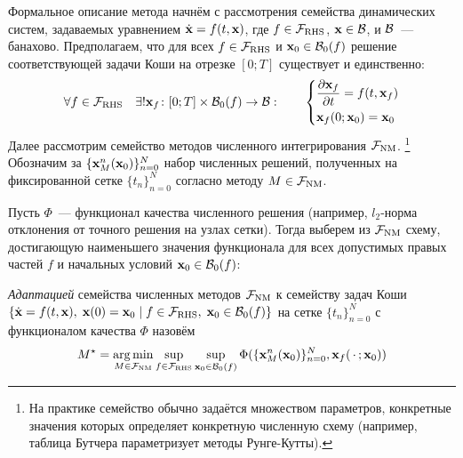 Формальное описание метода начнём с рассмотрения семейства динамических систем,
задаваемых уравнением $ \dot{\mathbf{x}} = f(t, \mathbf{x}) $,
где $ f \in \mathcal{F}_{\textnormal{RHS}} $, $ \mathbf{x} \in \mathcal{B} $, и $ \mathcal{B} $~--- банахово.
Предполагаем, что для всех $ f \in \mathcal{F}_{\textnormal{RHS}} $ и $ \mathbf{x}_0 \in \mathcal{B}_0(f) $ решение соответствующей задачи Коши
на отрезке $ [0; T] $ существует и единственно:
\[
    \forall f \in \mathcal{F}_{\textnormal{RHS}} \quad \exists! \mathbf{x}_f \colon [0; T] \times \mathcal{B}_0(f) \to \mathcal{B}: \qquad
    \begin{dcases}
        \frac{\partial \mathbf{x}_f}{\partial t} = f(t, \mathbf{x}_f) \\
        \mathbf{x}_f(0; \mathbf{x}_0) = \mathbf{x}_0
    \end{dcases}
\]
Далее рассмотрим семейство методов численного интегрирования $ \mathcal{F}_{\textnormal{NM}} $.%
\footnote{На практике семейство обычно задаётся множеством параметров,
конкретные значения которых определяет конкретную численную схему
(например, таблица Бутчера параметризует методы Рунге-Кутты).}
Обозначим за $ \{ \mathbf{x}_M^n(\mathbf{x}_0) \}_{n=0}^{N} $ набор численных решений,
полученных на фиксированной сетке $ \{ t_n \}_{n=0}^N $ согласно методу $ M \in \mathcal{F}_{\textnormal{NM}} $.

Пусть $ \Phi $~--- функционал качества численного решения
(например, $ l_2 $-норма отклонения от точного решения на узлах сетки).
Тогда выберем из $ \mathcal{F}_{\textnormal{NM}} $ схему,
достигающую наименьшего значения функционала
для всех допустимых правых частей $ f $ и начальных условий $ \mathbf{x}_0 \in \mathcal{B}_0(f) $:

\begin{definition}
    \label{definition:adaptation_method:adapted_numerical_method}
    \emph{Адаптацией} семейства численных методов $ \mathcal{F}_{\textnormal{NM}} $ к семейству задач Коши
    $ \{ \dot{\mathbf{x}} = f(t, \mathbf{x}), \; \mathbf{x}(0) = \mathbf{x}_0 \mid f \in \mathcal{F}_{\textnormal{RHS}}, \; \mathbf{x}_0 \in \mathcal{B}_0(f) \} $
    на сетке $ \{ t_n \}_{n=0}^N $ с функционалом качества $ \Phi $
    назовём
    \begin{equation}
        \label{eq:adaptation_method:adapted_numerical_method}
        M^\star = \operatorname*{\arg\min}_{M \in \mathcal{F}_{\textnormal{NM}}} \sup_{f \in \mathcal{F}_{\textnormal{RHS}}} \sup_{\mathbf{x}_0 \in \mathcal{B}_0(f)}
        \Phi(\{ \mathbf{x}_M^n(\mathbf{x}_0) \}_{n=0}^N, \mathbf{x}_f(\,\cdot\,; \mathbf{x}_0) )
    \end{equation}
\end{definition}

